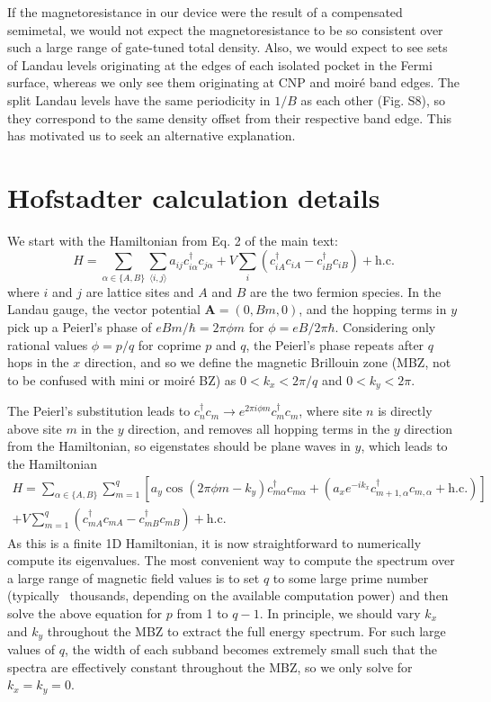 \documentclass[12pt,twocolumn]{article}
\begin{document}
If the magnetoresistance in our device were the result of a compensated semimetal, we would not expect the magnetoresistance to be so consistent over such a large range of gate-tuned total density. Also, we would expect to see sets of Landau levels originating at the edges of each isolated pocket in the Fermi surface, whereas we only see them originating at CNP and moiré band edges. The split Landau levels have the same periodicity in $1/B$ as each other (Fig. S8), so they correspond to the same density offset from their respective band edge. This has motivated us to seek an alternative explanation.

\section{Hofstadter calculation details}
We start with the Hamiltonian from Eq. 2 of the main text:
\begin{equation}
H = \sum_{\alpha\in\{A,B\}}\sum_{\langle i,j \rangle}a_{ij}c_{i\alpha}^\dagger c_{j\alpha} + V\sum_i\left(c_{iA}^\dagger c_{iA} - c_{iB}^\dagger c_{iB}\right)+ \mathrm{h.c.}
\end{equation}
where $i$ and $j$ are lattice sites and $A$ and $B$ are the two fermion species. In the Landau gauge, the vector potential $\mathbf{A}=(0,Bm,0)$, and the hopping terms in $y$ pick up a Peierl’s phase of $eBm/\hbar=2\pi \phi m$ for $\phi=eB/2\pi\hbar$. Considering only rational values $\phi=p/q$ for coprime $p$ and $q$, the Peierl’s phase repeats after $q$ hops in the $x$ direction, and so we define the magnetic Brillouin zone (MBZ, not to be confused with mini or moiré BZ) as $0<k_x<2\pi/q$ and $0<k_y<2\pi$.

The Peierl’s substitution leads to $c_n^\dagger c_m \rightarrow e^{2\pi i\phi m}c_m^\dagger c_m$, where site $n$ is directly above site $m$ in the $y$ direction, and removes all hopping terms in the $y$ direction from the Hamiltonian, so eigenstates should be plane waves in $y$, which leads to the Hamiltonian
\begin{multline*}
H = \sum_{\alpha\in\{A,B\}}\sum_{m=1}^q\left[ a_y\cos (2\pi \phi m-k_y) c_{m\alpha}^\dagger c_{m\alpha} + (a_xe^{-ik_x}c^\dagger_{m+1,\alpha}c_{m,\alpha} + \mathrm{h.c.})\right]\\ + V\sum_{m=1}^q\left(c_{mA}^\dagger c_{mA} - c_{mB}^\dagger c_{mB}\right)+ \mathrm{h.c.}
\end{multline*}
As this is a finite 1D Hamiltonian, it is now straightforward to numerically compute its eigenvalues. The most convenient way to compute the spectrum over a large range of magnetic field values is to set $q$ to some large prime number (typically ~thousands, depending on the available computation power) and then solve the above equation for $p$ from 1 to $q - 1$. In principle, we should vary $k_x$ and $k_y$ throughout the MBZ to extract the full energy spectrum. For such large values of $q$, the width of each subband becomes extremely small such that the spectra are effectively constant throughout the MBZ, so we only solve for $k_x=k_y=0$.
\end{document}
